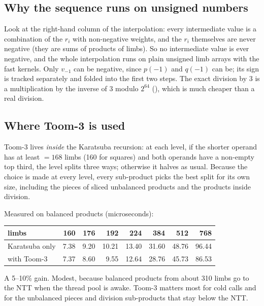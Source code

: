 \subsection{Why the sequence runs on unsigned numbers}

Look at the right-hand column of the interpolation: every intermediate value is a
combination of the $r_i$ with non-negative weights, and the $r_i$ themselves are never
negative (they are sums of products of limbs). So no intermediate value is ever negative,
and the whole interpolation runs on plain unsigned limb arrays with the fast kernels. Only
$v_{-1}$ can be negative, since $p(-1)$ and $q(-1)$ can be; its sign is tracked separately
and folded into the first two steps. The exact division by 3 is a multiplication by the
inverse of 3 modulo $2^{64}$ (), which is much cheaper than a real
division.

\subsection{Where Toom-3 is used}

Toom-3 lives \emph{inside} the Karatsuba recursion: at each level, if the shorter operand
has at least  $= 168$ limbs (160 for squares) and both
operands have a non-empty top third, the level splits three ways; otherwise it halves as
usual. Because the choice is made at every level, every sub-product picks the best split
for its own size, including the pieces of sliced unbalanced products and the products
inside division.

Measured on balanced products (microseconds):

\begin{center}
\begin{tabular}{lrrrrrrr}
\toprule
limbs & 160 & 176 & 192 & 224 & 384 & 512 & 768 \\
\midrule
Karatsuba only & 7.38 & 9.20 & 10.21 & 13.40 & 31.60 & 48.76 & 96.44 \\
with Toom-3 & 7.37 & 8.60 & 9.55 & 12.64 & 28.76 & 45.73 & 86.53 \\
\bottomrule
\end{tabular}
\end{center}

A 5--10\% gain. Modest, because balanced products from about 310 limbs go to the NTT when
the thread pool is awake. Toom-3 matters most for cold calls and for the unbalanced pieces
and division sub-products that stay below the NTT.

